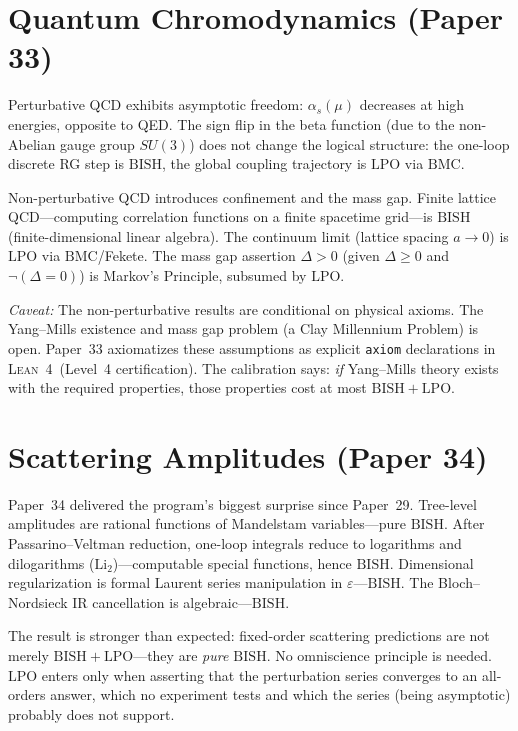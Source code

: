 \documentclass[11pt,a4paper]{report}
\theoremstyle{plain}
\theoremstyle{definition}
\theoremstyle{remark}
\newcommand{\BISH}{\mathrm{BISH}}
\newcommand{\LPO}{\mathrm{LPO}}
\newcommand{\BMC}{\mathrm{BMC}}
\newcommand{\Lean}{\textsc{Lean~4}}
\begin{document}
\section{Quantum Chromodynamics (Paper 33)}

Perturbative QCD exhibits asymptotic freedom: $\alpha_s(\mu)$ decreases at high energies, opposite to QED. The sign flip in the beta function (due to the non-Abelian gauge group $SU(3)$) does not change the logical structure: the one-loop discrete RG step is $\BISH$, the global coupling trajectory is $\LPO$ via $\BMC$.

Non-perturbative QCD introduces confinement and the mass gap. Finite lattice QCD---computing correlation functions on a finite spacetime grid---is $\BISH$ (finite-dimensional linear algebra). The continuum limit (lattice spacing $a \to 0$) is $\LPO$ via $\BMC$/Fekete. The mass gap assertion $\Delta > 0$ (given $\Delta \ge 0$ and $\neg(\Delta = 0)$) is Markov's Principle, subsumed by $\LPO$.

\emph{Caveat:} The non-perturbative results are conditional on physical axioms. The Yang--Mills existence and mass gap problem (a Clay Millennium Problem) is open. Paper~33 axiomatizes these assumptions as explicit \texttt{axiom} declarations in \Lean\ (Level~4 certification). The calibration says: \emph{if} Yang--Mills theory exists with the required properties, those properties cost at most $\BISH+\LPO$.

\section{Scattering Amplitudes (Paper 34)}

Paper~34 delivered the program's biggest surprise since Paper~29. Tree-level amplitudes are rational functions of Mandelstam variables---pure $\BISH$. After Passarino--Veltman reduction, one-loop integrals reduce to logarithms and dilogarithms ($\mathrm{Li}_2$)---computable special functions, hence $\BISH$. Dimensional regularization is formal Laurent series manipulation in $\varepsilon$---$\BISH$. The Bloch--Nordsieck IR cancellation is algebraic---$\BISH$.

The result is stronger than expected: fixed-order scattering predictions are not merely $\BISH+\LPO$---they are \emph{pure $\BISH$}. No omniscience principle is needed. $\LPO$ enters only when asserting that the perturbation series converges to an all-orders answer, which no experiment tests and which the series (being asymptotic) probably does not support.
\end{document}
